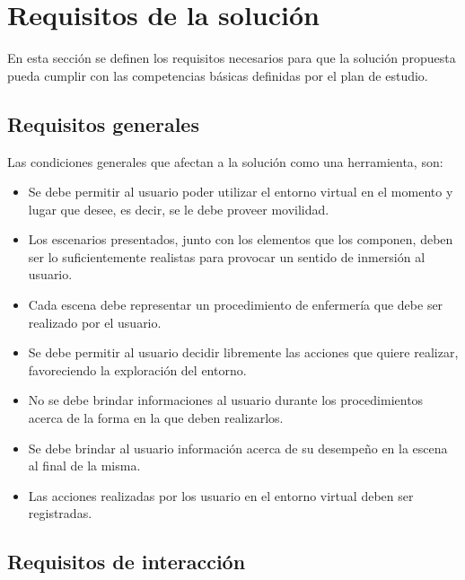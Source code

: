 \section{Requisitos de la solución}
\label{sec:requisitos}

En esta sección se definen los requisitos necesarios para que la solución propuesta pueda 
cumplir con las competencias básicas definidas por el plan de estudio.

\subsection{Requisitos generales}

Las condiciones generales que afectan a la solución como una herramienta, son:

\begin{itemize}
\item Se debe permitir al usuario poder utilizar el entorno virtual en el
    momento y lugar que desee, es decir, se le debe proveer movilidad.

\item Los escenarios presentados, junto con los elementos que los componen,
    deben ser lo suficientemente realistas para provocar un sentido de
    inmersión al usuario.

\item Cada escena debe representar un procedimiento de enfermería que debe ser
    realizado por el usuario.

\item Se debe permitir al usuario decidir libremente las acciones que
    quiere realizar, favoreciendo la exploración del entorno.

\item No se debe brindar informaciones al usuario durante los procedimientos acerca de la 
	forma en la que deben realizarlos.

\item Se debe brindar al usuario información acerca de su desempeño en
    la escena al final de la misma.
    
\item Las acciones realizadas por los usuario en el entorno virtual deben ser
    registradas.

\end{itemize}

\subsection{Requisitos de interacción}


